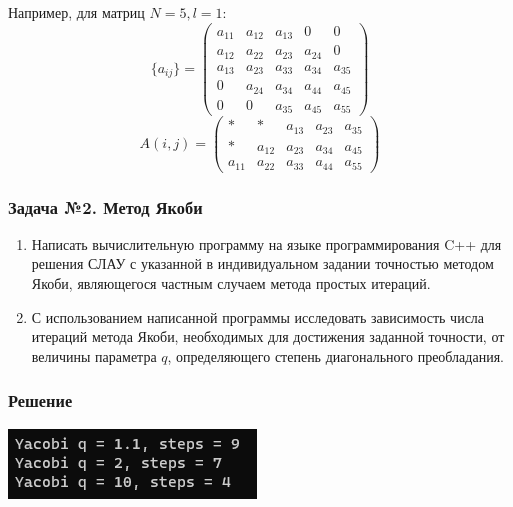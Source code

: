 \documentclass[a4paper, fontsize=14pt]{article}
\begin{document}
Например, для матриц $N = 5, l = 1$:
\begin{equation*}
    \{a_{ij}\} = \begin{pmatrix}
        a_{11} & a_{12} & a_{13} & 0      & 0 \\
        a_{12} & a_{22} & a_{23} & a_{24} & 0 \\
        a_{13} & a_{23} & a_{33} & a_{34} & a_{35} \\
        0      & a_{24} & a_{34} & a_{44} & a_{45} \\
        0      & 0      & a_{35} & a_{45} & a_{55}
    \end{pmatrix}
\end{equation*}
\begin{equation*}
    A(i, j) = \begin{pmatrix}
        * & * & a_{13} & a_{23} & a_{35} \\
        * & a_{12} & a_{23} & a_{34} & a_{45} \\
        a_{11} & a_{22} & a_{33} & a_{44} & a_{55}
    \end{pmatrix}
\end{equation*}


\subsubsection*{Задача №2. Метод Якоби}
\begin{enumerate}
    
    \item Написать вычислительную программу на языке программирования C++
    для решения СЛАУ с указанной в индивидуальном задании точностью
    методом Якоби, являющегося частным случаем метода простых
    итераций.
    \item С использованием написанной программы исследовать зависимость
    числа итераций метода Якоби, необходимых для достижения заданной
    точности, от величины параметра $q$, определяющего степень
    диагонального преобладания.
\end{enumerate}
\subsubsection*{Решение}

\begin{center}
    \includegraphics[]{src/yacobi.png}
    \label{fig:yacobi}
\end{center}
\end{document}
